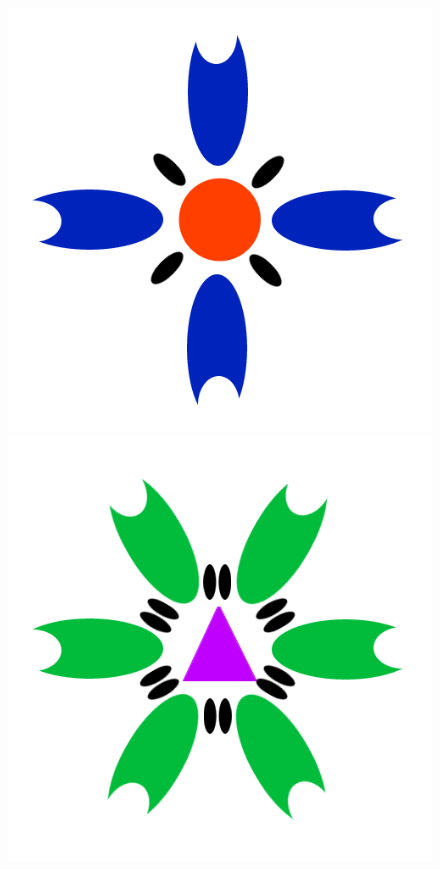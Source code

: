 \documentclass[twocolumn]{svjour3}          %
\begin{document}
\begin{figure}
  \includegraphics[scale=0.15]{flower1.png}
  \includegraphics[scale=0.15]{flower2.png}

\end{figure}
\end{document}
